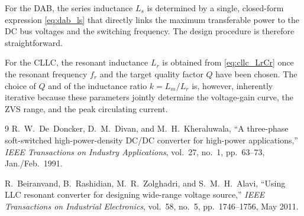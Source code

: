 \documentclass[a4paper, 11pt]{article}
\begin{document}
For the DAB, the series inductance $L_s$ is determined by a single,
closed-form expression \eqref{eq:dab_ls} that directly links the
maximum transferable power to the DC bus voltages and the switching
frequency.  The design procedure is therefore straightforward.

For the CLLC, the resonant inductance $L_r$ is obtained from
\eqref{eq:cllc_LrCr} once the resonant frequency $f_r$ and the target
quality factor $Q$ have been chosen.  The choice of $Q$ and of the
inductance ratio $k = L_m/L_r$ is, however, inherently iterative
because these parameters jointly determine the voltage-gain curve, the
ZVS range, and the peak circulating current.

\begin{thebibliography}{9}
    R.~W.~De~Doncker, D.~M.~Divan, and M.~H.~Kheraluwala,
    ``A three-phase soft-switched high-power-density DC/DC converter
    for high-power applications,''
    \emph{IEEE Transactions on Industry Applications},
    vol.~27, no.~1, pp.~63--73, Jan./Feb.\ 1991.

    R.~Beiranvand, B.~Rashidian, M.~R.~Zolghadri, and
    S.~M.~H.~Alavi,
    ``Using LLC resonant converter for designing wide-range voltage
    source,''
    \emph{IEEE Transactions on Industrial Electronics},
    vol.~58, no.~5, pp.~1746--1756, May 2011.
\end{thebibliography}
\end{document}
